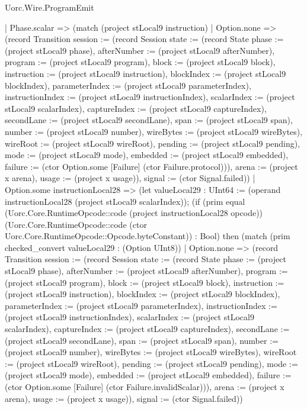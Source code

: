 \begin{lexlean}{Uorc.Wire.ProgramEmit}
\begin{semanticmodule}
{        | Phase.scalar => (match (project stLocal9 instruction)
          | Option.none => (record Transition {session := (record Session {state := (record State {phase := (project stLocal9 phase), afterNumber := (project stLocal9 afterNumber), program := (project stLocal9 program), block := (project stLocal9 block), instruction := (project stLocal9 instruction), blockIndex := (project stLocal9 blockIndex), parameterIndex := (project stLocal9 parameterIndex), instructionIndex := (project stLocal9 instructionIndex), scalarIndex := (project stLocal9 scalarIndex), captureIndex := (project stLocal9 captureIndex), secondLane := (project stLocal9 secondLane), span := (project stLocal9 span), number := (project stLocal9 number), wireBytes := (project stLocal9 wireBytes), wireRoot := (project stLocal9 wireRoot), pending := (project stLocal9 pending), mode := (project stLocal9 mode), embedded := (project stLocal9 embedded), failure := (ctor Option.some [Failure] (ctor Failure.protocol))}), arena := (project x arena), usage := (project x usage)}), signal := (ctor Signal.failed)})
          | Option.some instructionLocal28 => (let valueLocal29 : UInt64 := (operand instructionLocal28 (project stLocal9 scalarIndex)); (if (prim equal (Uorc.Core.RuntimeOpcode::code (project instructionLocal28 opcode)) (Uorc.Core.RuntimeOpcode::code (ctor Uorc.Core.RuntimeOpcode::Opcode.byteConstant)) : Bool) then (match (prim checked_convert valueLocal29 : (Option UInt8))
            | Option.none => (record Transition {session := (record Session {state := (record State {phase := (project stLocal9 phase), afterNumber := (project stLocal9 afterNumber), program := (project stLocal9 program), block := (project stLocal9 block), instruction := (project stLocal9 instruction), blockIndex := (project stLocal9 blockIndex), parameterIndex := (project stLocal9 parameterIndex), instructionIndex := (project stLocal9 instructionIndex), scalarIndex := (project stLocal9 scalarIndex), captureIndex := (project stLocal9 captureIndex), secondLane := (project stLocal9 secondLane), span := (project stLocal9 span), number := (project stLocal9 number), wireBytes := (project stLocal9 wireBytes), wireRoot := (project stLocal9 wireRoot), pending := (project stLocal9 pending), mode := (project stLocal9 mode), embedded := (project stLocal9 embedded), failure := (ctor Option.some [Failure] (ctor Failure.invalidScalar))}), arena := (project x arena), usage := (project x usage)}), signal := (ctor Signal.failed)})
}
\end{semanticmodule}
\end{lexlean}

